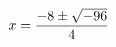 \documentclass[preview]{standalone}
\begin{document}
\begin{align*}
\special{dvisvgm:raw <g id='unique000'>}x=\frac{-8\pm\sqrt{-96}}{4}\special{dvisvgm:raw </g>}
\end{align*}
\end{document}
